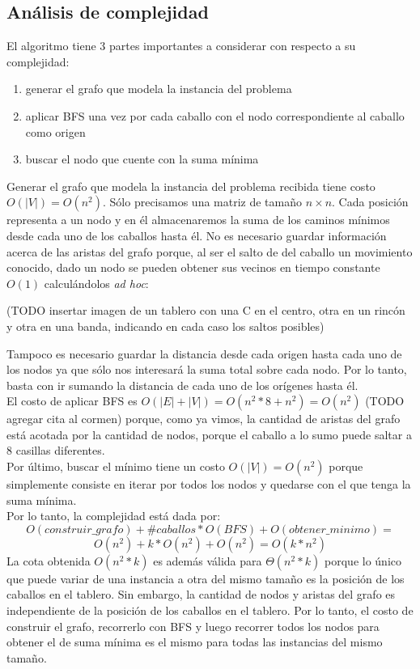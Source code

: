 \subsection{Análisis de complejidad}
El algoritmo tiene 3 partes importantes a considerar con respecto a su complejidad:
\begin{enumerate}
  \item generar el grafo que modela la instancia del problema
  \item aplicar BFS una vez por cada caballo con el nodo correspondiente al caballo como origen
  \item buscar el nodo que cuente con la suma mínima
\end{enumerate}
Generar el grafo que modela la instancia del problema recibida tiene costo $O(\left\vert{V}\right\vert) = O(n^2)$. 
Sólo precisamos una matriz de tamaño $n \times n$. Cada posición representa a un nodo y en él almacenaremos la suma
de los caminos mínimos desde cada uno de los caballos hasta él. No es necesario guardar información acerca de las
aristas del grafo porque, al ser el salto de del caballo un movimiento conocido, dado un nodo se pueden obtener sus vecinos
en tiempo constante $O(1)$ calculándolos \textit{ad hoc}:
\begin{center}
(TODO insertar imagen de un tablero con una C en el centro, otra en un rincón y otra en una banda, indicando en cada
caso los saltos posibles)
\end{center}
Tampoco es necesario guardar la distancia desde cada origen hasta cada uno de los nodos ya que sólo nos interesará
la suma total sobre cada nodo. Por lo tanto, basta con ir sumando la distancia de cada uno de los orígenes hasta él.\\
El costo de aplicar BFS es $O(\left\vert{E}\right\vert + \left\vert{V}\right\vert) = O(n^2 * 8 + n^2) = O(n^2)$ (TODO agregar cita al cormen) porque, 
como ya vimos, la cantidad de aristas del grafo está acotada por la cantidad de nodos, porque el caballo a lo sumo
puede saltar a 8 casillas diferentes.\\
Por último, buscar el mínimo tiene un costo $O(\left\vert{V}\right\vert) = O(n^2)$ porque simplemente consiste
en iterar por todos los nodos y quedarse con el que tenga la suma mínima.\\
Por lo tanto, la complejidad está dada por:
\begin{displaymath}
  O(construir\_grafo) + \#caballos * O(BFS) + O(obtener\_minimo) = 
\end{displaymath}
\begin{displaymath}
  O(n^2) + k * O(n^2) + O(n^2) = O(k * n^2)
\end{displaymath}
La cota obtenida $O(n^2 * k)$ es además válida para $\Theta (n^2 * k)$ porque lo único que puede variar de una
instancia a otra del mismo tamaño es la posición de los caballos en el tablero. Sin embargo, la cantidad de nodos
y aristas del grafo es independiente de la posición de los caballos en el tablero. Por lo tanto, el costo de
construir el grafo, recorrerlo con BFS y luego recorrer todos los nodos para obtener el de suma mínima
es el mismo para todas las instancias del mismo tamaño.

